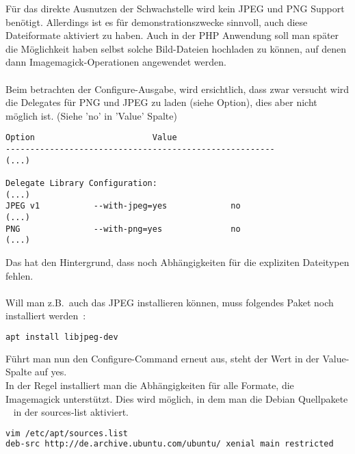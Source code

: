 \newpage
Für das direkte Ausnutzen der Schwachstelle wird kein JPEG und PNG Support benötigt.
Allerdings ist es für demonstrationszwecke sinnvoll, auch diese Dateiformate aktiviert zu haben.
Auch in der PHP Anwendung soll man später die Möglichkeit haben selbst solche Bild-Dateien hochladen zu können,
auf denen dann Imagemagick-Operationen angewendet werden.\\\\

Beim betrachten der Configure-Ausgabe, wird ersichtlich,
dass zwar versucht wird die Delegates für PNG und JPEG zu laden (siehe Option),
dies aber nicht möglich ist. (Siehe 'no' in 'Value' Spalte)

\begin{lstlisting}[language=Text, caption=Imagemagick Installation: Auszug aus Configure-Output,label={lst:installconfigureoutput}]
Option                        Value
-------------------------------------------------------
(...)

Delegate Library Configuration:
(...)
JPEG v1           --with-jpeg=yes             no
(...)
PNG               --with-png=yes              no
(...)
\end{lstlisting}
\vspace{5mm}

Das hat den Hintergrund, dass noch Abhängigkeiten für die expliziten Dateitypen fehlen.\\\\

Will man z.B.\ auch das JPEG installieren können, muss folgendes Paket noch installiert werden~\cite{ImageMagickPNGDelegate}:

\begin{lstlisting}[language=Bash, caption=Imagemagick Installation: Delegate Dependencies,label={lst:installdelegatedep}]
apt install libjpeg-dev
\end{lstlisting}
\vspace{5mm}

Führt man nun den Configure-Command erneut aus, steht der Wert in der Value-Spalte auf yes.\\

In der Regel installiert man die Abhängigkeiten für alle Formate, die Imagemagick unterstützt.
Dies wird möglich, in dem man die Debian Quellpakete
~\cite{DateiEtcApt} in der sources-list aktiviert.~\cite{HowInstallImageMagick}\\


\begin{lstlisting}[language=Bash, caption=Imagemagick Installation: Sources List,label={lst:installsourcelist}]
vim /etc/apt/sources.list
deb-src http://de.archive.ubuntu.com/ubuntu/ xenial main restricted
\end{lstlisting}
\vspace{5mm}

